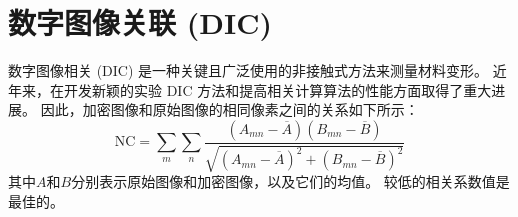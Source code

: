 \section{数字图像关联 (DIC)}

数字图像相关 (DIC) 是一种关键且广泛使用的非接触式方法来测量材料变形。 
近年来，在开发新颖的实验 DIC 方法和提高相关计算算法的性能方面取得了重大进展。 
因此，加密图像和原始图像的相同像素之间的关系如下所示：
\begin{equation}
    \text{NC}=\sum_{m}\sum_{n}\frac{(A_{mn}-\overline{A})(B_{mn}-\overline{B})}{\sqrt{(A_{mn}-\overline{A})^2+(B_{mn}-\overline{B})^2} }
\end{equation}
其中$A$和$B$分别表示原始图像和加密图像，以及它们的均值。 
较低的相关系数值是最佳的。